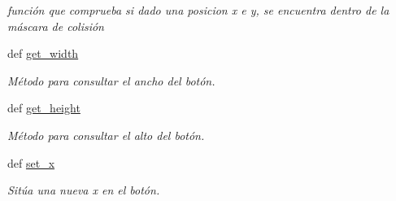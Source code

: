 \begin{DoxyCompactItemize}
\begin{DoxyCompactList}\small\item\em función que comprueba si dado una posicion x e y, se encuentra dentro de la máscara de colisión \end{DoxyCompactList}\item 
def \hyperlink{classengine_1_1button_1_1Button_a8481a1fd66b60148c03c604eab943549}{get\-\_\-width}
\begin{DoxyCompactList}\small\item\em \-Método para consultar el ancho del botón. \end{DoxyCompactList}\item 
def \hyperlink{classengine_1_1button_1_1Button_a840f285737bc1cf410a32d6c11f4318f}{get\-\_\-height}
\begin{DoxyCompactList}\small\item\em \-Método para consultar el alto del botón. \end{DoxyCompactList}\item 
\hypertarget{classengine_1_1button_1_1Button_a86cfa452e6ce8b5590def31a4e165426}{
def \hyperlink{classengine_1_1button_1_1Button_a86cfa452e6ce8b5590def31a4e165426}{set\-\_\-x}}
\label{classengine_1_1button_1_1Button_a86cfa452e6ce8b5590def31a4e165426}

\begin{DoxyCompactList}\small\item\em \-Sitúa una nueva x en el botón. \end{DoxyCompactList}\end{DoxyCompactItemize}
